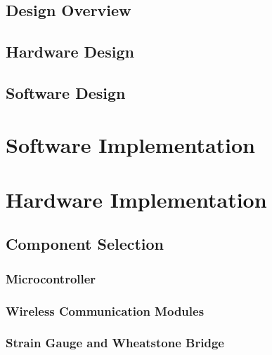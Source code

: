 \documentclass{l3proj}
\begin{document}
\section{Design Overview}



\section{Hardware Design}



\section{Software Design}

\chapter{Software Implementation}
\label{chap:software impl}

\chapter{Hardware Implementation}


\section{Component Selection}

\subsection{Microcontroller}


\subsection{Wireless Communication Modules}


\subsection{Strain Gauge and Wheatstone Bridge}



\end{document}

